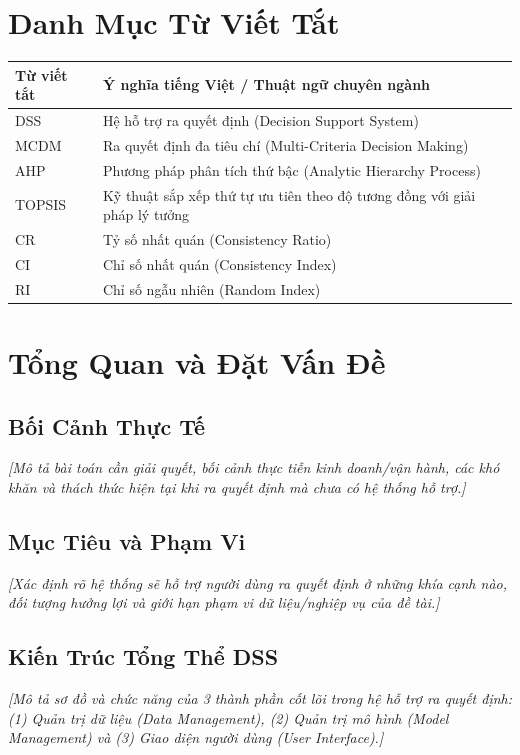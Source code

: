 \documentclass[12pt]{article}
\begin{document}
\newpage
\section*{Danh Mục Từ Viết Tắt}
\begin{table}[h!]
\centering
\begin{tabular}{ll}
\hline
\textbf{Từ viết tắt} & \textbf{Ý nghĩa tiếng Việt / Thuật ngữ chuyên ngành} \\
\hline
DSS & Hệ hỗ trợ ra quyết định (Decision Support System) \\
MCDM & Ra quyết định đa tiêu chí (Multi-Criteria Decision Making) \\
AHP & Phương pháp phân tích thứ bậc (Analytic Hierarchy Process) \\
TOPSIS & Kỹ thuật sắp xếp thứ tự ưu tiên theo độ tương đồng với giải pháp lý tưởng \\
CR & Tỷ số nhất quán (Consistency Ratio) \\
CI & Chỉ số nhất quán (Consistency Index) \\
RI & Chỉ số ngẫu nhiên (Random Index) \\
\hline
\end{tabular}
\end{table}

\newpage

\section{Tổng Quan và Đặt Vấn Đề}

\subsection{Bối Cảnh Thực Tế}
\textit{[Mô tả bài toán cần giải quyết, bối cảnh thực tiễn kinh doanh/vận hành, các khó khăn và thách thức hiện tại khi ra quyết định mà chưa có hệ thống hỗ trợ.]}

\subsection{Mục Tiêu và Phạm Vi}
\textit{[Xác định rõ hệ thống sẽ hỗ trợ người dùng ra quyết định ở những khía cạnh nào, đối tượng hưởng lợi và giới hạn phạm vi dữ liệu/nghiệp vụ của đề tài.]}

\subsection{Kiến Trúc Tổng Thể DSS}
\textit{[Mô tả sơ đồ và chức năng của 3 thành phần cốt lõi trong hệ hỗ trợ ra quyết định: (1) Quản trị dữ liệu (Data Management), (2) Quản trị mô hình (Model Management) và (3) Giao diện người dùng (User Interface).]}
\end{document}

